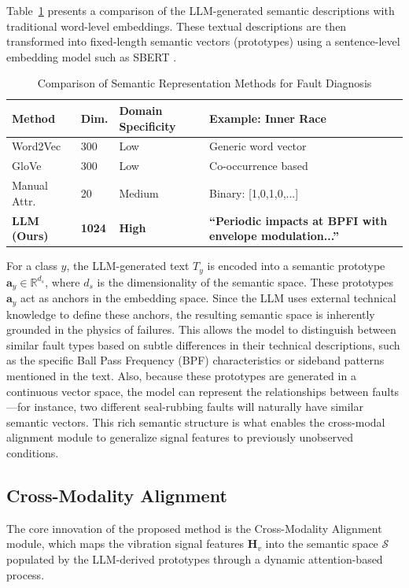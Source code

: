 \documentclass[journal]{IEEEtran}
\begin{document}
Table~\ref{tab:llm_semantics} presents a comparison of the LLM-generated semantic descriptions with traditional word-level embeddings. These textual descriptions are then transformed into fixed-length semantic vectors (prototypes) using a sentence-level embedding model such as SBERT \cite{reimers2019sentence}.

\begin{table}[!t]
\centering
\caption{Comparison of Semantic Representation Methods for Fault Diagnosis}
\label{tab:llm_semantics}
\renewcommand{\arraystretch}{1.2}
\begin{tabular}{p{1.8cm}p{1.2cm}p{1.5cm}p{2.2cm}}
\toprule
\textbf{Method} & \textbf{Dim.} & \textbf{Domain Specificity} & \textbf{Example: Inner Race} \\
\midrule
Word2Vec & 300 & Low & Generic word vector \\
GloVe & 300 & Low & Co-occurrence based \\
Manual Attr. & 20 & Medium & Binary: [1,0,1,0,...] \\
\textbf{LLM (Ours)} & \textbf{1024} & \textbf{High} & \textbf{``Periodic impacts at BPFI with envelope modulation...''} \\
\bottomrule
\end{tabular}
\end{table}

For a class $y$, the LLM-generated text $T_y$ is encoded into a semantic prototype $\mathbf{a}_y \in \mathbb{R}^{d_s}$, where $d_s$ is the dimensionality of the semantic space. These prototypes $\mathbf{a}_y$ act as anchors in the embedding space. Since the LLM uses external technical knowledge to define these anchors, the resulting semantic space is inherently grounded in the physics of failures. This allows the model to distinguish between similar fault types based on subtle differences in their technical descriptions, such as the specific Ball Pass Frequency (BPF) characteristics or sideband patterns mentioned in the text. Also, because these prototypes are generated in a continuous vector space, the model can represent the relationships between faults—for instance, two different seal-rubbing faults will naturally have similar semantic vectors. This rich semantic structure is what enables the cross-modal alignment module to generalize signal features to previously unobserved conditions.

\subsection{Cross-Modality Alignment}
The core innovation of the proposed method is the Cross-Modality Alignment module, which maps the vibration signal features $\mathbf{H}_v$ into the semantic space $\mathcal{S}$ populated by the LLM-derived prototypes through a dynamic attention-based process.
\end{document}
